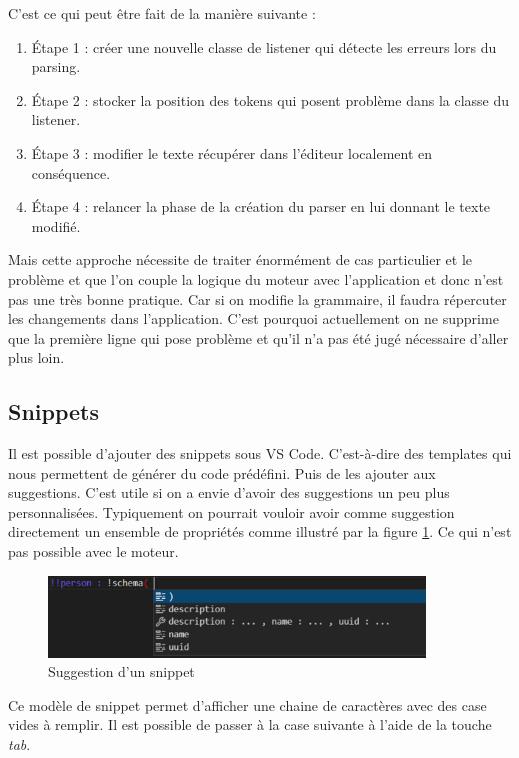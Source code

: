 \documentclass[
    iict, %
    il, %
]{heig-tb}
\begin{document}
C'est ce qui peut être fait de la manière suivante :
\begin{enumerate}
    \item Étape 1 : créer une nouvelle classe de listener qui détecte les erreurs lors du parsing.
    \item Étape 2 : stocker la position des tokens qui posent problème dans la classe du listener.
    \item Étape 3 : modifier le texte récupérer dans l'éditeur localement en conséquence.
    \item Étape 4 : relancer la phase de la création du parser en lui donnant le texte modifié.
\end{enumerate}

Mais cette approche nécessite de traiter énormément de cas particulier et le problème et que l'on couple la logique du moteur avec l'application et donc n'est pas une très bonne pratique.
Car si on modifie la grammaire, il faudra répercuter les changements dans l'application.
C'est pourquoi actuellement on ne supprime que la première ligne qui pose problème et qu'il n'a pas été jugé nécessaire d'aller plus loin.

\subsection{Snippets}
Il est possible d'ajouter des snippets sous VS Code. C'est-à-dire des templates qui nous permettent de générer du code prédéfini. Puis de les ajouter aux suggestions.
C'est utile si on a envie d'avoir des suggestions un peu plus personnalisées.
Typiquement on pourrait vouloir avoir comme suggestion directement un ensemble de propriétés comme illustré par la figure \ref*{snippet-suggestion}.
Ce qui n'est pas possible avec le moteur.

\begin{figure}[!h]
    \begin{center}
        \includegraphics[width=10cm]{assets/figures/snippet-suggestion.png}
    \end{center}
    \caption[Suggestion d'un snippet]{\label{snippet-suggestion} Suggestion d'un snippet}
\end{figure}

Ce modèle de snippet permet d'afficher une chaine de caractères avec des case vides à remplir.
Il est possible de passer à la case suivante à l'aide de la touche \emph{tab}.
\end{document}
